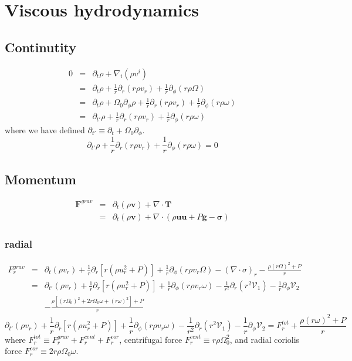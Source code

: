 \documentclass{article}
\begin{document}
\section{Viscous hydrodynamics}
\subsection{Continutity}
\begin{eqnarray*}
  0 &=&\partial_t \rho + \nabla_i (\rho v^i)\\
    &=& \partial_t \rho + \frac{1}{r}\partial_r(r \rho v_r) + \frac{1}{r}\partial_{\phi}(r \rho \Omega)\\
    &=&  \partial_t \rho + \Omega_0 \partial_{\phi}\rho + \frac{1}{r}\partial_r(r \rho v_r) + \frac{1}{r}\partial_{\phi}(r \rho \omega)\\
    &=& \partial_{t'} \rho + \frac{1}{r}\partial_r(r \rho v_r) + \frac{1}{r}\partial_{\phi}(r \rho \omega)
\end{eqnarray*}
where we have defined $\partial_{t'}\equiv \partial_t + \Omega_0 \partial_{\phi}$.
\begin{equation}
  \boxed{\partial_{t'} \rho + \frac{1}{r}\partial_r(r \rho v_r) + \frac{1}{r}\partial_{\phi}(r \rho \omega) = 0}
\end{equation}
\subsection{Momentum}
\begin{eqnarray*}
  \mathbf{F}^{grav} &=& \partial_t (\rho \mathbf{v}) + \nabla \cdot \mathbf{T}  \\
                    &=& \partial_t (\rho \mathbf{v}) + \nabla \cdot (\rho \mathbf{u} \mathbf{u} + P \mathbf{g} -\mathbf{\sigma})  
\end{eqnarray*}
\subsubsection{radial}
\begin{eqnarray*}
    F^{grav}_r &=& \partial_t (\rho v_r) + \frac{1}{r}\partial_r\left[r (\rho u_r^2 + P)\right] + \frac{1}{r}\partial_{\phi}(r\rho v_r \Omega) - (\nabla \cdot \sigma)_r - \frac{\rho (r\Omega)^2 + P}{r}\\
             &=& \partial_{t'}(\rho v_r) + \frac{1}{r}\partial_r \left[r(\rho u_r^2 + P)\right] + \frac{1}{r}\partial_{\phi}(r\rho v_r \omega) - \frac{1}{r^2}\partial_{r}(r^2 \mathcal{V}_1) - \frac{1}{r} \partial_{\phi} \mathcal{V}_2\\
             &&- \frac{\rho [(r\Omega_0)^2 + 2r\Omega_0 \omega + (r\omega)^2] + P}{r}
\end{eqnarray*}
\begin{equation}
    \boxed{\partial_{t'}(\rho v_r) + \frac{1}{r}\partial_r \left[r(\rho u_r^2 + P)\right] + \frac{1}{r}\partial_{\phi}(r\rho v_r \omega) - \frac{1}{r^2}\partial_{r}(r^2 \mathcal{V}_1) - \frac{1}{r} \partial_{\phi} \mathcal{V}_2 = F^{tot}_r + \frac{\rho(r\omega)^2 + P}{r}}
\end{equation}
where $F^{tot}_r \equiv F^{grav}_r + F^{cent}_r + F^{cor}_r$, centrifugal force $F^{cent}_r \equiv r \rho \Omega_0^2$, and radial coriolis force $F^{cor}_r \equiv 2 r \rho \Omega_0 \omega$.
\end{document}
